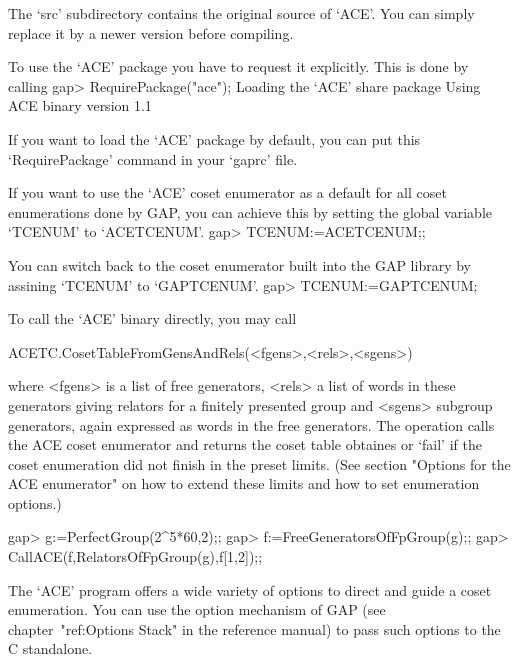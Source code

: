 The `src' subdirectory contains the original source of `ACE'. You can simply
replace it by a newer version before compiling.


To use the `ACE' package you have to request it explicitly. This is done by
calling 
\begintt
gap> RequirePackage("ace");
  Loading the `ACE' share package
  Using ACE binary version 1.1
\endtt

If you want to load the `ACE' package by default, you can put this
`RequirePackage' command in your `gaprc' file.

If you want to use the `ACE' coset enumerator as a default for all coset
enumerations done by GAP, you can achieve this by setting the global
variable `TCENUM' to `ACETCENUM'.
\begintt
gap> TCENUM:=ACETCENUM;;
\endtt

You
can switch back to the coset enumerator built into the GAP library by
assining `TCENUM' to `GAPTCENUM'.
\begintt
gap> TCENUM:=GAPTCENUM;
\endtt



To call the `ACE' binary directly, you may call

\>ACETC.CosetTableFromGensAndRels(<fgens>,<rels>,<sgens>)

where <fgens> is a list of free generators, <rels> a list of words in these
generators giving relators for a finitely presented group and <sgens>
subgroup generators, again expressed as words in the free generators. The
operation calls the ACE coset enumerator and returns the coset table
obtaines or `fail' if the coset enumeration did not finish in the preset
limits. (See section "Options for the ACE enumerator" on how to extend these
limits and how to set enumeration options.)

\begintt
gap> g:=PerfectGroup(2^5*60,2);;
gap> f:=FreeGeneratorsOfFpGroup(g);;
gap> CallACE(f,RelatorsOfFpGroup(g),f{[1,2]});;
\endtt


The `ACE' program offers a wide variety of options to direct and guide a
coset enumeration. You can use the option mechanism of GAP (see
chapter~"ref:Options Stack" in the reference manual) to pass such options to
the C standalone.

